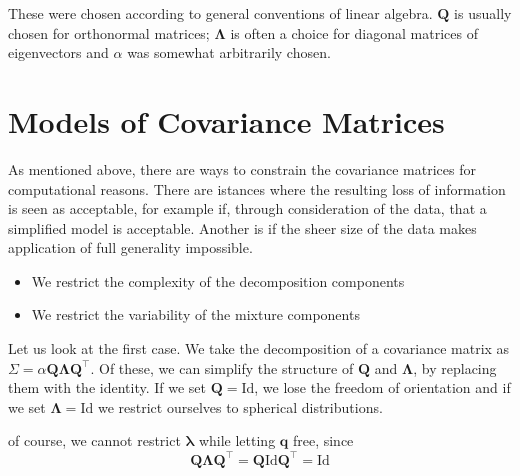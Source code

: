 These were chosen according to general conventions of linear algebra. $ \pmb{Q} $
is usually chosen for orthonormal matrices; $ \pmb{\Lambda} $ is often a choice 
for diagonal matrices of eigenvectors and $ \alpha $ was somewhat arbitrarily 
chosen.


\section{Models of Covariance Matrices}
\label{sec:models}


As mentioned above, there are ways to constrain the covariance matrices for 
computational reasons. There are istances where the resulting loss of 
information is seen as acceptable, for example if, through consideration of the
data, that a simplified model is acceptable. Another is if the sheer size of 
the data makes application of full generality impossible.
\begin{itemize}
    \item We restrict the complexity of the decomposition components
    \item We restrict the variability of the mixture components
\end{itemize}
Let us look at the first case. We take the decomposition of a covariance matrix
as $\Sigma = \alpha \pmb{Q\Lambda Q}^\top$. Of these, we can simplify the 
structure of $\pmb{Q}$ and $\pmb{\Lambda}$, by replacing them with the identity.
If we set $\pmb{Q}=\mathrm{Id}$, we lose the freedom of orientation and if we 
set $\pmb{\Lambda}=\mathrm{Id}$ we restrict ourselves to spherical 
distributions.

of course, we cannot restrict $\pmb{\lambda}$ while letting $\pmb{q}$ free, 
since
\begin{equation} 
    \pmb{Q\Lambda Q}^\top = \pmb{Q}\mathrm{Id}\pmb{Q}^\top = \mathrm{Id}
\end{equation}

